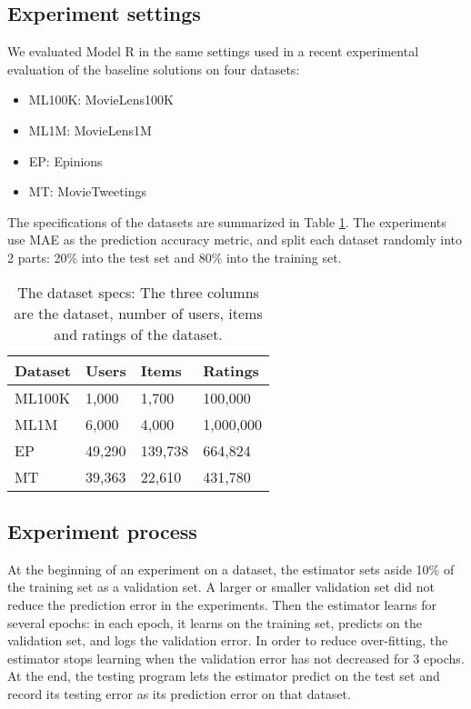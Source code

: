 \documentclass[letterpaper]{article}
\begin{document}
\subsection{Experiment settings}
We evaluated Model R in the same settings used in a recent experimental 
evaluation of the baseline solutions \cite{polatidis2016multi} on four datasets:
\begin{itemize}
	\item ML100K: MovieLens100K\cite{harper2015movielens}
	\item ML1M: MovieLens1M\cite{harper2015movielens}
	\item EP: Epinions \cite{massa2007trust}
	\item MT: MovieTweetings \cite{dooms2013movietweetings}
\end{itemize}
The specifications of the datasets are summarized in Table \ref{tab:dataset}.
The experiments use MAE as the prediction accuracy metric,
and split each dataset randomly into 2 parts: 20\% into the test set and 80\% 
into the training set.
\begin{table}[!htb]
	\centering
	\caption{The dataset specs: 
		The three columns are the dataset, number of users, items and ratings 
		of the dataset.
		}
	\begin{tabularx}{0.47\textwidth}{|X|X|X|X|}  \hline \rowcolor{blue!50}
		Dataset & Users   & Items   & Ratings \\ \hline
		ML100K  & 1,000   & 1,700   & 100,000 \\ \hline
		ML1M    & 6,000   & 4,000   & 1,000,000 \\ \hline
		EP      & 49,290  & 139,738 & 664,824 \\ \hline
		MT      & 39,363  & 22,610  & 431,780 \\ \hline
	\end{tabularx}
	\label{tab:dataset}
\end{table}

\subsection{Experiment process}
At the beginning of an experiment on a dataset,
the estimator sets aside 10\% of the training set as a validation set.
A larger or smaller validation set did not reduce the prediction error in the 
experiments.
Then the estimator learns for several epochs:
in each epoch,
it learns on the training set,
predicts on the validation set,
and logs the validation error.
In order to reduce over-fitting,
the estimator stops learning when the validation error has not decreased for 3 
epochs.
At the end, the testing program lets the estimator predict on the test set 
and record its testing error as its prediction error on that dataset.
\end{document}
